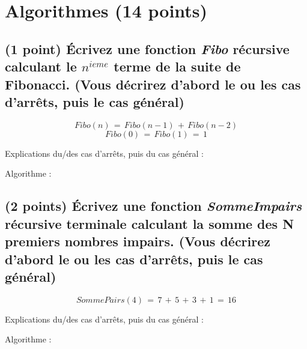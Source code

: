 \documentclass[11pt,a4paper]{article}
\begin{document}
\clearpage

\section{Algorithmes (14 points)}

\subsection{(1 point) \'Ecrivez une fonction \og \textit{Fibo} \fg{} récursive calculant le $ n^{ieme} $ terme de la suite de Fibonacci. (Vous décrirez d'abord le ou les cas d'arrêts, puis le cas général) }


\vspace*{-0.5cm}

\begin{center}

\begin{equation*}
Fibo(n) \, = \, Fibo(n - 1) \, + \, Fibo(n - 2)
\end{equation*}
%
\vspace*{-0.5cm}
%
\begin{equation*}
Fibo(0) \, = \, Fibo(1) \, = \, 1
\end{equation*}

Explications du/des cas d'arrêts, puis du cas général :

\bigskip

Algorithme :

\bigskip

\end{center}


\clearpage


\subsection{(2 points) \'Ecrivez une fonction \og \textit{SommeImpairs} \fg{} récursive terminale calculant la somme des N premiers nombres impairs. (Vous décrirez d'abord le ou les cas d'arrêts, puis le cas général) }

\vspace*{-0.5cm}

\begin{center}

\begin{equation*}
SommePairs(4)  \, = \,  7 \, + \, 5 \, + \, 3 \, + \, 1  \, = \,  16
\end{equation*}

Explications du/des cas d'arrêts, puis du cas général :

\bigskip

Algorithme :

\bigskip

\end{center}
\end{document}
